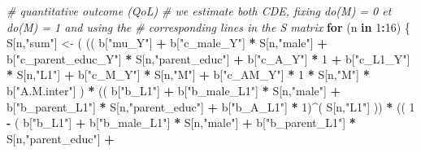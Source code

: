 \documentclass[
]{book}
\newenvironment{Shaded}{\begin{snugshade}}{\end{snugshade}}
\newcommand{\CommentTok}[1]{\textcolor[rgb]{0.56,0.35,0.01}{\textit{#1}}}
\newcommand{\ControlFlowTok}[1]{\textcolor[rgb]{0.13,0.29,0.53}{\textbf{#1}}}
\newcommand{\DecValTok}[1]{\textcolor[rgb]{0.00,0.00,0.81}{#1}}
\newcommand{\NormalTok}[1]{#1}
\newcommand{\OtherTok}[1]{\textcolor[rgb]{0.56,0.35,0.01}{#1}}
\newcommand{\SpecialCharTok}[1]{\textcolor[rgb]{0.81,0.36,0.00}{\textbf{#1}}}
\newcommand{\StringTok}[1]{\textcolor[rgb]{0.31,0.60,0.02}{#1}}
\begin{document}
\begin{Shaded}
\begin{Highlighting}[]
  \CommentTok{\# quantitative outcome (QoL)}
  \CommentTok{\# we estimate both CDE, fixing do(M) = 0 et do(M) = 1 and using the }
  \CommentTok{\# corresponding lines in the S matrix}
  \ControlFlowTok{for}\NormalTok{ (n }\ControlFlowTok{in} \DecValTok{1}\SpecialCharTok{:}\DecValTok{16}\NormalTok{) \{}
\NormalTok{    S[n,}\StringTok{"sum"}\NormalTok{] }\OtherTok{\textless{}{-}}\NormalTok{ ( (( b[}\StringTok{"mu\_Y"}\NormalTok{] }\SpecialCharTok{+} 
\NormalTok{                        b[}\StringTok{"c\_male\_Y"}\NormalTok{] }\SpecialCharTok{*}\NormalTok{ S[n,}\StringTok{"male"}\NormalTok{] }\SpecialCharTok{+} 
\NormalTok{                        b[}\StringTok{"c\_parent\_educ\_Y"}\NormalTok{] }\SpecialCharTok{*}\NormalTok{ S[n,}\StringTok{"parent\_educ"}\NormalTok{] }\SpecialCharTok{+} 
\NormalTok{                        b[}\StringTok{"c\_A\_Y"}\NormalTok{] }\SpecialCharTok{*} \DecValTok{1} \SpecialCharTok{+} 
\NormalTok{                        b[}\StringTok{"c\_L1\_Y"}\NormalTok{] }\SpecialCharTok{*}\NormalTok{ S[n,}\StringTok{"L1"}\NormalTok{] }\SpecialCharTok{+}
\NormalTok{                        b[}\StringTok{"c\_M\_Y"}\NormalTok{] }\SpecialCharTok{*}\NormalTok{ S[n,}\StringTok{"M"}\NormalTok{] }\SpecialCharTok{+}
\NormalTok{                        b[}\StringTok{"c\_AM\_Y"}\NormalTok{] }\SpecialCharTok{*} \DecValTok{1} \SpecialCharTok{*}\NormalTok{ S[n,}\StringTok{"M"}\NormalTok{] }\SpecialCharTok{*}\NormalTok{ b[}\StringTok{"A.M.inter"}\NormalTok{] ) }\SpecialCharTok{*}
\NormalTok{                      (( b[}\StringTok{"b\_L1"}\NormalTok{] }\SpecialCharTok{+}
\NormalTok{                           b[}\StringTok{"b\_male\_L1"}\NormalTok{] }\SpecialCharTok{*}\NormalTok{ S[n,}\StringTok{"male"}\NormalTok{] }\SpecialCharTok{+}  
\NormalTok{                           b[}\StringTok{"b\_parent\_L1"}\NormalTok{] }\SpecialCharTok{*}\NormalTok{ S[n,}\StringTok{"parent\_educ"}\NormalTok{] }\SpecialCharTok{+}
\NormalTok{                           b[}\StringTok{"b\_A\_L1"}\NormalTok{] }\SpecialCharTok{*} \DecValTok{1}\NormalTok{)}\SpecialCharTok{\^{}}\NormalTok{( S[n,}\StringTok{"L1"}\NormalTok{] )) }\SpecialCharTok{*}
\NormalTok{                      (( }\DecValTok{1} \SpecialCharTok{{-}}\NormalTok{ ( b[}\StringTok{"b\_L1"}\NormalTok{] }\SpecialCharTok{+}
\NormalTok{                                 b[}\StringTok{"b\_male\_L1"}\NormalTok{] }\SpecialCharTok{*}\NormalTok{ S[n,}\StringTok{"male"}\NormalTok{] }\SpecialCharTok{+}  
\NormalTok{                                 b[}\StringTok{"b\_parent\_L1"}\NormalTok{] }\SpecialCharTok{*}\NormalTok{ S[n,}\StringTok{"parent\_educ"}\NormalTok{] }\SpecialCharTok{+}

\end{Highlighting}
\end{Shaded}
\end{document}
